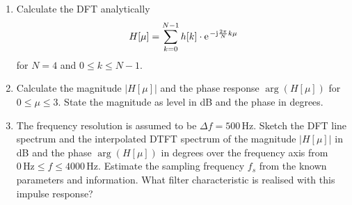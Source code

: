 \documentclass[11pt,a4paper,DIV=12]{scrartcl}
\begin{document}
\begin{enumerate}[label=\alph*)]
	\item Calculate the DFT analytically
%
	\begin{equation}
	H[\mu]=\sum_{k=0}^{N-1}h[k]\cdot\e^{-\im\frac{2\pi}{N}k\mu}
	\end{equation}
	for $N=4$ and $0\leq k\leq N-1$.
%
	\item Calculate the magnitude $|H[\mu]|$ and the phase response $\arg(H[\mu])$
	for $0\leq\mu\leq 3$. State the magnitude as level in dB and the phase in
	degrees.
%
	\item The frequency resolution is assumed to be $\Delta f=500\,\text{Hz}$.
	Sketch the DFT line spectrum and the interpolated DTFT spectrum of the
	magnitude $|H[\mu]|$ in dB and the phase $\arg(H[\mu])$ in degrees over the
	frequency axis from $0\,\text{Hz}\leq f\leq4000\,\text{Hz}$.
	Estimate the sampling frequency $f_s$ from the known parameters and information.
	What filter characteristic is realised with this impulse response?
\end{enumerate}
\end{document}
